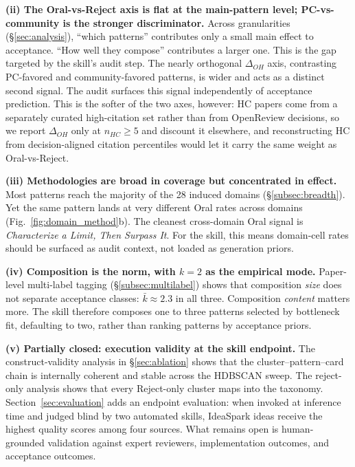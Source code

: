 \documentclass[10pt,a4paper]{article}
\begin{document}
\textbf{(ii) The Oral-vs-Reject axis is flat at the main-pattern level; PC-vs-community is the stronger discriminator.} Across granularities (\S\ref{sec:analysis}), ``which patterns'' contributes only a small main effect to acceptance. ``How well they compose'' contributes a larger one. This is the gap targeted by the skill's audit step. The nearly orthogonal $\Delta_{OH}$ axis, contrasting PC-favored and community-favored patterns, is wider and acts as a distinct second signal. The audit surfaces this signal independently of acceptance prediction. This is the softer of the two axes, however: HC papers come from a separately curated high-citation set rather than from OpenReview decisions, so we report $\Delta_{OH}$ only at $n_{HC} \geq 5$ and discount it elsewhere, and reconstructing HC from decision-aligned citation percentiles would let it carry the same weight as Oral-vs-Reject.

\textbf{(iii) Methodologies are broad in coverage but concentrated in effect.} Most patterns reach the majority of the 28 induced domains (\S\ref{subsec:breadth}). Yet the same pattern lands at very different Oral rates across domains (Fig.~\ref{fig:domain_method}b). The cleanest cross-domain Oral signal is \emph{Characterize a Limit, Then Surpass It}. For the skill, this means domain-cell rates should be surfaced as audit context, not loaded as generation priors.

\textbf{(iv) Composition is the norm, with $k{=}2$ as the empirical mode.} Paper-level multi-label tagging (\S\ref{subsec:multilabel}) shows that composition \emph{size} does not separate acceptance classes: $\bar{k}\approx 2.3$ in all three. Composition \emph{content} matters more. The skill therefore composes one to three patterns selected by bottleneck fit, defaulting to two, rather than ranking patterns by acceptance priors.

\textbf{(v) Partially closed: execution validity at the skill endpoint.} The construct-validity analysis in \S\ref{sec:ablation} shows that the cluster--pattern--card chain is internally coherent and stable across the HDBSCAN sweep. The reject-only analysis shows that every Reject-only cluster maps into the taxonomy. Section~\ref{sec:evaluation} adds an endpoint evaluation: when invoked at inference time and judged blind by two automated skills, IdeaSpark ideas receive the highest quality scores among four sources. What remains open is human-grounded validation against expert reviewers, implementation outcomes, and acceptance outcomes.
\end{document}
